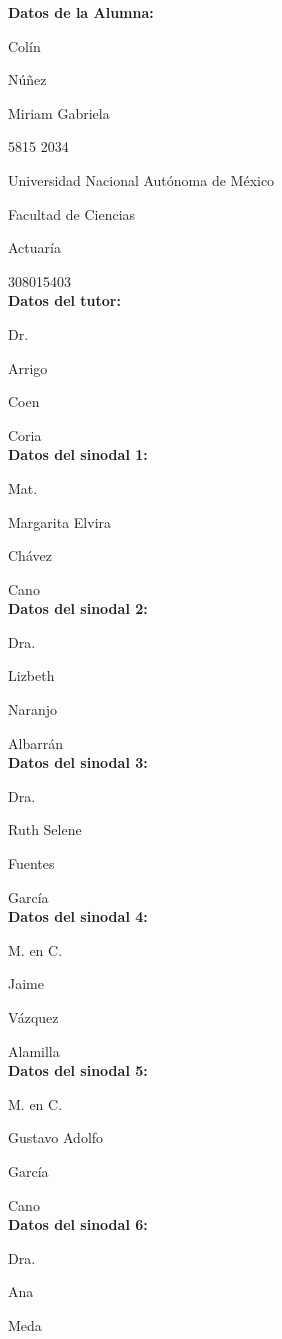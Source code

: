{\setlength{\parskip}{0mm}
\textbf{Datos de la Alumna:}

Colín

Núñez

Miriam Gabriela

5815 2034

Universidad Nacional Autónoma de México

Facultad de Ciencias

Actuaría

308015403\\


\textbf{Datos del tutor:}

Dr.

Arrigo

Coen

Coria\\


\textbf{Datos del sinodal 1:}

Mat.

Margarita Elvira

Chávez

Cano\\


\textbf{Datos del sinodal 2:}

Dra.

Lizbeth

Naranjo

Albarrán\\


\textbf{Datos del sinodal 3:}

Dra.

Ruth Selene

Fuentes

García\\


\textbf{Datos del sinodal 4:}

M. en C.

Jaime

Vázquez

Alamilla\\


\textbf{Datos del sinodal 5:}

M. en C.

Gustavo Adolfo

García

Cano\\


\textbf{Datos del sinodal 6:}

Dra.

Ana

Meda 

}
